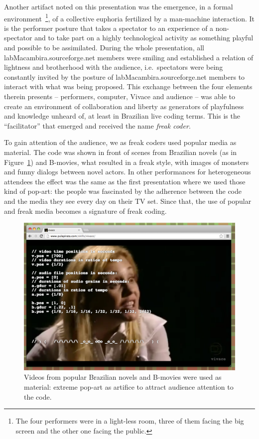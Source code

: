 \documentclass[letterpaper, 12pt]{article}
\begin{document}
Another artifact noted on this presentation was the emergence, in a
formal environment~\footnote{The four performers were in a light-less
  room, three of them facing the big screen and the other one facing
  the public.}, of a collective euphoria fertilized by a man-machine
interaction. It is the performer posture that takes a spectator to an
experience of a non-spectator and to take part on a highly
technological activity as something playful and possible to be
assimilated.  During the whole presentation, all
labMacambira.sourceforge.net members were smiling and established a
relation of lightness and brotherhood with the audience,
i.e.\ spectators were being constantly invited by the posture of
labMacambira.sourceforge.net members to interact with what was being
proposed.  This exchange between the four elements therein presents --
performers, computer, Vivace and audience -- was able to create an
environment of collaboration and liberty as generators of playfulness
and knowledge unheard of, at least in Brazilian live coding
terms. This is the ``facilitator'' that emerged and received the name
\emph{freak coder}.

To gain attention of the audience, we as freak coders used popular
media as material. The code was shown in front of scenes from
Brazilian novels (as in Figure~\ref{fig:novela}) and B-movies, what
resulted in a freak style, with images of monsters and funny dialogs
between novel actors. In other performances for heterogeneous
attendees the effect was the same as the first presentation where we
used those kind of pop-art: the people was fascinated by the adherence
between the code and the media they see every day on their TV
set. Since that, the use of popular and freak media becomes a
signature of freak coding.

\begin{figure}[htpb]
  \begin{center}
    \includegraphics[scale=.3]{img/fig_novela.png}
    \caption{Videos from popular Brazilian novels and B-movies were
      used as material: extreme pop-art as artifice to attract
      audience attention to the code.}
    \label{fig:novela}
  \end{center}
\end{figure}
\end{document}
